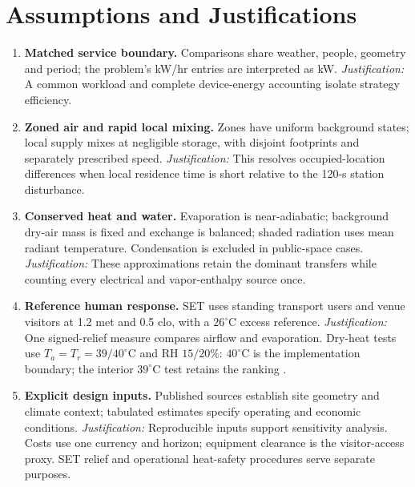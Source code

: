 \section{Assumptions and Justifications}
\begingroup\setlength{\intextsep}{4pt}
\label{sec:assumptions}
\begin{enumerate}[leftmargin=*,itemsep=2pt,topsep=2pt,label=\textbf{A\arabic*.}]
\item \textbf{Matched service boundary.} Comparisons share weather, people, geometry and period; the problem's kW/hr entries are interpreted as kW. \textit{Justification:} A common workload and complete device-energy accounting isolate strategy efficiency.
\item \textbf{Zoned air and rapid local mixing.} Zones have uniform background states; local supply mixes at negligible storage, with disjoint footprints and separately prescribed speed. \textit{Justification:} This resolves occupied-location differences when local residence time is short relative to the 120-s station disturbance.
\item \textbf{Conserved heat and water.} Evaporation is near-adiabatic; background dry-air mass is fixed and exchange is balanced; shaded radiation uses mean radiant temperature. Condensation is excluded in public-space cases. \textit{Justification:} These approximations retain the dominant transfers while counting every electrical and vapor-enthalpy source once.
\item \textbf{Reference human response.} SET uses standing transport users and venue visitors at 1.2 met and 0.5 clo, with a $26^\circ$C excess reference. \textit{Justification:} One signed-relief measure compares airflow and evaporation. Dry-heat tests use $T_a=T_r=39/40^\circ$C and RH $15/20\%$: $40^\circ$C is the implementation boundary; the interior $39^\circ$C test retains the ranking \cite{pythermal}.
\item \textbf{Explicit design inputs.} Published sources establish site geometry and climate context; tabulated estimates specify operating and economic conditions. \textit{Justification:} Reproducible inputs support sensitivity analysis. Costs use one currency and horizon; equipment clearance is the visitor-access proxy. SET relief and operational heat-safety procedures serve separate purposes.
\end{enumerate}


